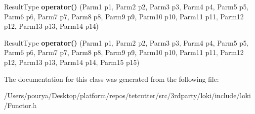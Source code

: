 \begin{DoxyCompactItemize}
\item 
\hypertarget{classLoki_1_1MemFunHandler_aff53745842140345ecddafc2f6c57a39}{}Result\+Type {\bfseries operator()} (Parm1 p1, Parm2 p2, Parm3 p3, Parm4 p4, Parm5 p5, Parm6 p6, Parm7 p7, Parm8 p8, Parm9 p9, Parm10 p10, Parm11 p11, Parm12 p12, Parm13 p13, Parm14 p14)\label{classLoki_1_1MemFunHandler_aff53745842140345ecddafc2f6c57a39}

\item 
\hypertarget{classLoki_1_1MemFunHandler_ae97c580e9e95f7cf7426652ac8a690b4}{}Result\+Type {\bfseries operator()} (Parm1 p1, Parm2 p2, Parm3 p3, Parm4 p4, Parm5 p5, Parm6 p6, Parm7 p7, Parm8 p8, Parm9 p9, Parm10 p10, Parm11 p11, Parm12 p12, Parm13 p13, Parm14 p14, Parm15 p15)\label{classLoki_1_1MemFunHandler_ae97c580e9e95f7cf7426652ac8a690b4}

\end{DoxyCompactItemize}


The documentation for this class was generated from the following file\+:\begin{DoxyCompactItemize}
\item 
/\+Users/pourya/\+Desktop/platform/repos/tetcutter/src/3rdparty/loki/include/loki/Functor.\+h\end{DoxyCompactItemize}
